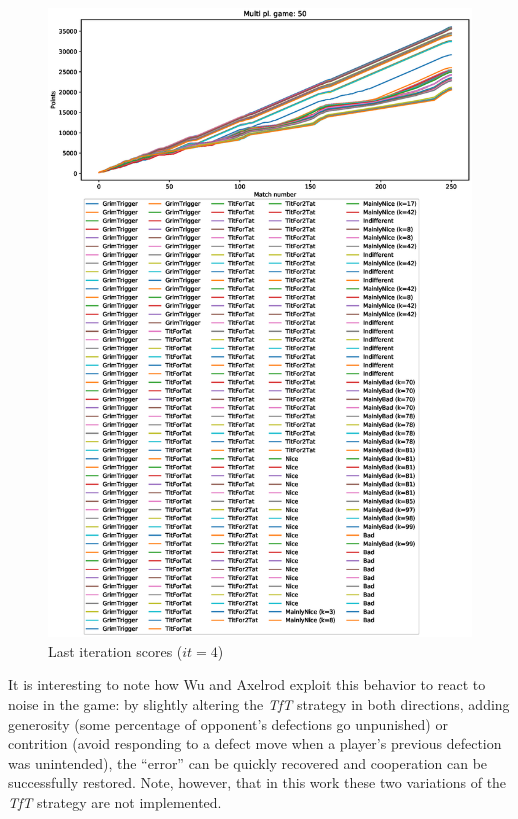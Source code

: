 \documentclass[journal,10pt,twoside]{IEEEtran}
\begin{document}
\begin{figure}[!ht]
    \centering
    \includegraphics[width=1\columnwidth]{../img/ripdmp-incr/alt1/ripdmp-scores-increasing-pop-50-r4}
    \caption{Last iteration scores ($it=4$)}
    \label{fig:incrLI}
\end{figure}

It is interesting to note how Wu and Axelrod \cite{IPDnoise} exploit this behavior to react to noise in the game: by slightly altering the \textit{TfT} strategy in both directions, adding generosity (some percentage of opponent's defections go unpunished) or contrition (avoid responding to a defect move when a player's previous defection was unintended), the ``error'' can be quickly recovered and cooperation can be successfully restored. Note, however, that in this work these two variations of the \textit{TfT} strategy are not implemented.
\end{document}
